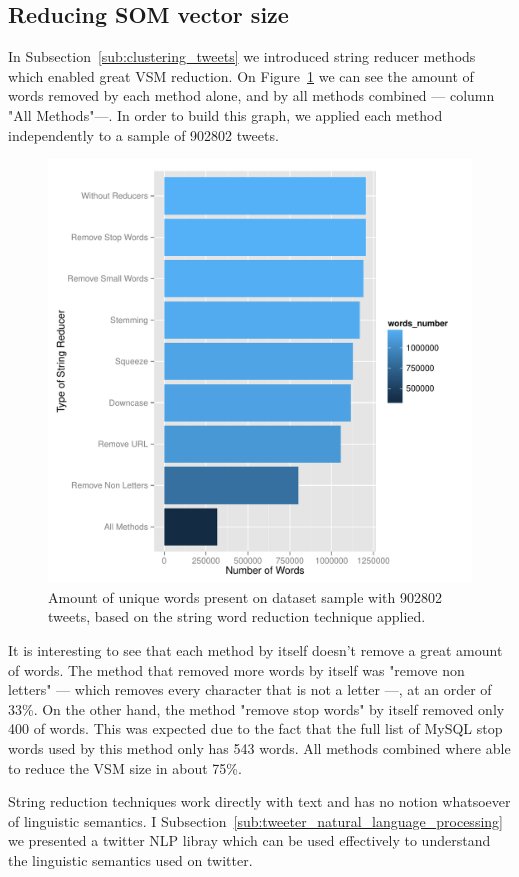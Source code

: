 \subsection{Reducing SOM vector size}
\label{sub:reducing_som_vector_size}
In Subsection~\ref{sub:clustering_tweets} we introduced string reducer methods which enabled great \ac{VSM} reduction. On Figure~\ref{fig:plot_word_red} we can see the amount of words removed by each method alone, and by all methods combined --- column "All Methods"---. In order to build this graph, we applied each method independently to a sample of 902802 tweets.

\begin{figure}[htpb]
  \centering
  \includegraphics[width=0.8\linewidth]{./plots/svm/plot_wordcount.pdf}
  \caption{Amount of unique words present on dataset sample with 902802 tweets, based on the string word reduction technique applied.}
  \label{fig:plot_word_red}
\end{figure}

It is interesting to see that each method by itself doesn't remove a great amount of words. The method that removed more words by itself was "remove non letters" --- which removes every character that is not a letter ---, at an order of 33\%. On the other hand, the method "remove stop words" by itself removed only 400 of words. This was expected due to the fact that the full list of MySQL stop words used by this method only has 543 words. All methods combined where able to reduce the \ac{VSM} size in about 75\%.

String reduction techniques work directly with text and has no notion whatsoever of linguistic semantics. I Subsection~\ref{sub:tweeter_natural_language_processing} we presented a twitter \ac{NLP} libray which can be used effectively to understand the linguistic semantics used on twitter. 


